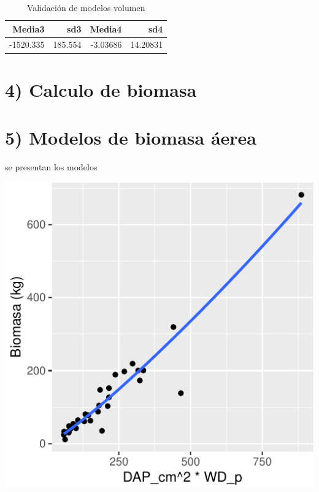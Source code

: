 \documentclass[9pt,onecolumn,twoside,]{pinp}
\begin{document}
\begin{table}

\caption{\label{tab:unnamed-chunk-11}Validación de modelos volumen}
\centering
\begin{tabular}[t]{r|r|r|r}
\hline
Media3 & sd3 & Media4 & sd4\\
\hline
-1520.335 & 185.554 & -3.03686 & 14.20831\\
\hline
\end{tabular}
\end{table}

\hypertarget{calculo-de-biomasa}{%
\section{4) Calculo de biomasa}\label{calculo-de-biomasa}}

\hypertarget{modelos-de-biomasa-uxe1erea}{%
\section{5) Modelos de biomasa
áerea}\label{modelos-de-biomasa-uxe1erea}}

se presentan los modelos

\begin{center}\includegraphics{David_Londono_Lopera_Cristian_Ganan_parcial3_files/figure-latex/unnamed-chunk-21-1} \end{center}
\end{document}
